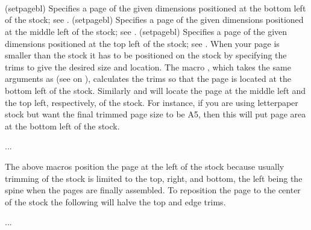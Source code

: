 \begin{syntax}
\cmd{\setpagebl} \\
\cmd{\setpageml} \\
\cmd{\setpagetl} \\
\end{syntax}
\glossary(setpagebl)%
  {}%
  {Specifies a page of the given dimensions positioned at the bottom left
   of the stock; see .}
\glossary(setpagebl)%
  {}%
  {Specifies a page of the given dimensions positioned at the middle left
   of the stock; see .}
\glossary(setpagebl)%
  {}%
  {Specifies a page of the given dimensions positioned at the top left
   of the stock; see .}
When your page is smaller than the stock it has to be positioned on
the stock by specifying the trims to give the desired size and location.
The macro \cmd{\setpagebl}, which takes the same arguments as 
\cmd{\settrimmedsize} (see  on ),
calculates the trims so that the page is located at the bottom left of
the stock. Similarly \cmd{\setpageml} and \cmd{\setpagetl} will locate
the page at the middle left and the top left, respectively, of the stock.
For instance, if you are using letterpaper stock but want the final trimmed
page size to be A5, then this will put page area at the bottom left of the
stock.
\begin{lcode}
\pagebv %
\setpagebl{\paperheight}{\paperwidth}{*}
...
\checkandfixthelayout
\end{lcode}
The above macros position the page at the left of the stock because usually 
trimming of the stock is limited to the top, right, and bottom, the left 
being the spine when the pages are finally assembled. To reposition the page to
the center of the stock the following will halve the top and edge
trims.
\begin{lcode}
\settrims{0.5\trimtop}{0.5\trimedge}
...
\checkandfixthelayout
\end{lcode}

